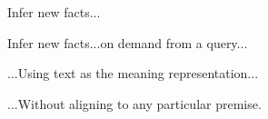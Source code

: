 




\begin{frame}[noframenumbering]{Infer new facts...}
\begin{center}
  \teaserBlindInferenceNaturalOrder
\end{center}
\end{frame}
\begin{frame}[noframenumbering]{Infer new facts...on demand from a query...}
\begin{center}
  \teaserBlindInference
\end{center}
\end{frame}

\begin{frame}[noframenumbering]{...Using text as the meaning representation...}
\begin{center}
  \teaserInference
\end{center}
\end{frame}

\begin{frame}[noframenumbering]{...Without aligning to any particular premise.}
\begin{center}
  \teaserFullDerivation
\end{center}
\end{frame}

